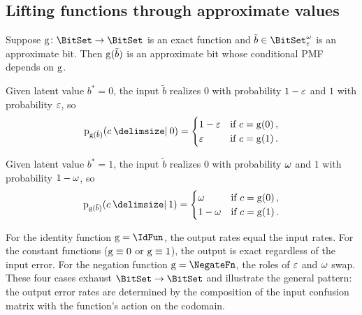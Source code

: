 \documentclass[ ../main.tex]{subfiles}
\begin{document}
\subsection{Lifting functions through approximate values}
\label{sec:lifting_preview}

Suppose $\Fun{g} \colon \BitSet \to \BitSet$ is an exact function and $\tilde{b} \in \AT{\BitSet}[\fprate][\fnrate]$ is an approximate bit.
Then $\Fun{g}(\tilde{b})$ is an approximate bit whose conditional PMF depends on $\Fun{g}$.

Given latent value $b^* = 0$, the input $\tilde{b}$ realizes $0$ with probability $1 - \varepsilon$ and $1$ with probability $\varepsilon$, so
\begin{equation}
\label{eq:lift_cond_0}
\Fun{p}_{\Fun{g}(\tilde{b})}(c \Given 0) =
\begin{cases}
1 - \fprate & \text{if } c = \Fun{g}(0)\,, \\
\fprate     & \text{if } c = \Fun{g}(1)\,.
\end{cases}
\end{equation}

Given latent value $b^* = 1$, the input $\tilde{b}$ realizes $0$ with probability $\omega$ and $1$ with probability $1 - \omega$, so
\begin{equation}
\label{eq:lift_cond_1}
\Fun{p}_{\Fun{g}(\tilde{b})}(c \Given 1) =
\begin{cases}
\fnrate     & \text{if } c = \Fun{g}(0)\,, \\
1 - \fnrate & \text{if } c = \Fun{g}(1)\,.
\end{cases}
\end{equation}

For the identity function $\Fun{g} = \IdFun$, the output rates equal the input rates.
For the constant functions ($\Fun{g} \equiv 0$ or $\Fun{g} \equiv 1$), the output is exact regardless of the input error.
For the negation function $\Fun{g} = \NegateFn$, the roles of $\varepsilon$ and $\omega$ swap.
These four cases exhaust $\BitSet \to \BitSet$ and illustrate the general pattern: the output error rates are determined by the composition of the input confusion matrix with the function's action on the codomain.
\end{document}
